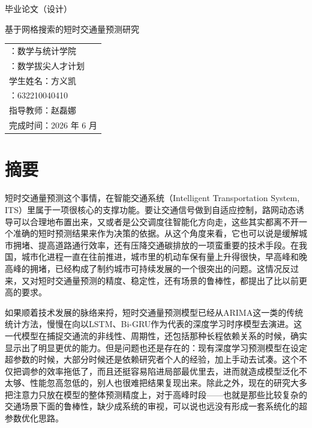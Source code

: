 \documentclass[12pt,a4paper,oneside]{ctexbook}
\begin{document}
	
	\begin{titlepage}
		\centering
		\vspace*{2cm}
		{\heiti{} 毕业论文（设计）}\par
		\vspace{2cm}
		{\heiti{} 基于网格搜索的短时交通量预测研究}\par
		\vspace{2.5cm}
		{\songti{}
			\begin{tabular}{l}
				\makebox[4em][s]{学\hfill 院}：数学与统计学院 \\[8pt]
				\makebox[4em][s]{专\hfill 业}：数学拔尖人才计划 \\[8pt]
				学生姓名：方义凯 \\[8pt]
				\makebox[4em][s]{学\hfill 号}：632210040410 \\[8pt]
				指导教师：赵磊娜 \\[8pt]
				完成时间：2026 年 6 月
			\end{tabular}\par
		}
		\vfill
	\end{titlepage}
	
	\chapter*{摘要}
	\setcounter{page}{1}
	
	短时交通量预测这个事情，在智能交通系统（Intelligent Transportation System, ITS）里属于一项很核心的支撑功能。要让交通信号做到自适应控制，路网动态诱导可以合理地布置出来，又或者是公交调度往智能化方向走，这些其实都离不开一个准确的短时预测结果来作为决策的依据。从这个角度来看，它也可以说是缓解城市拥堵、提高道路通行效率，还有压降交通碳排放的一项蛮重要的技术手段。在我国，城市化进程一直在往前推进，城市里的机动车保有量上升得很快，早高峰和晚高峰的拥堵，已经构成了制约城市可持续发展的一个很突出的问题。这情况反过来，又对短时交通量预测的精度、稳定性，还有场景的鲁棒性，都提出了比以前更高的要求。
	
	如果顺着技术发展的脉络来捋，短时交通量预测模型已经从ARIMA这一类的传统统计方法，慢慢在向以LSTM、Bi-GRU作为代表的深度学习时序模型去演进。这一代模型在捕捉交通流的非线性、周期性，还包括那种长程依赖关系的时候，确实显示出了明显更优的能力。但是问题也还是存在的：现有深度学习预测模型在设定超参数的时候，大部分时候还是依赖研究者个人的经验，加上手动去试凑。这个不仅把调参的效率拖低了，而且还挺容易陷进局部最优里去，进而就造成模型泛化不太够、性能忽高忽低的，别人也很难把结果复现出来。除此之外，现在的研究大多把注意力只放在模型的整体预测精度上，对于高峰时段——也就是那些比较复杂的交通场景下面的鲁棒性，缺少成系统的审视，可以说也远没有形成一套系统化的超参数优化思路。
	
\end{document}
